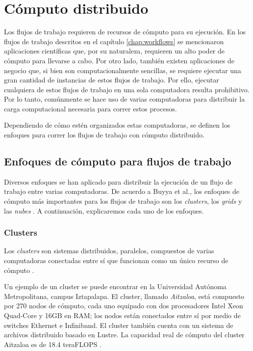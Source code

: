 \chapter{Cómputo distribuido}
Los flujos de trabajo requieren de recursos de cómputo para su ejecución. En los flujos de trabajo descritos en el capítulo \ref{chap:workflows} se mencionaron aplicaciones científicas que, por su naturaleza, requieren un alto poder de cómputo para llevarse a cabo. Por otro lado, también existen aplicaciones de negocio que, si bien son computacionalmente sencillas, se requiere ejecutar una gran cantidad de instancias de estos flujos de trabajo. Por ello, ejecutar cualquiera de estos flujos de trabajo en una sola computadora resulta prohibitivo. Por lo tanto, comúnmente se hace uso de varias computadoras para distribuir la carga computacional necesaria para correr estos procesos.

Dependiendo de cómo estén organizados estas computadoras, se definen los enfoques para correr los flujos de trabajo con cómputo distribuido.

\section{Enfoques de cómputo para flujos de trabajo}
Diversos enfoques se han aplicado para distribuir la ejecución de un flujo de trabajo entre varias computadoras.  De acuerdo a Buyya et al., los enfoques de cómputo más importantes para los flujos de trabajo son los \emph{clusters}, los \emph{grids} y las \emph{nubes} \cite{buyya2009cloud}. A continuación, explicaremos cada uno de los enfoques.

\subsection{Clusters}
Los \emph{clusters} son sistemas distribuidos, paralelos, compuestos de varias computadoras conectadas entre sí que funcionan como un único recurso de cómputo \cite{buyya2009cloud}. 

Un ejemplo de un cluster se puede encontrar en la Universidad Autónoma Metropolitana, campus Iztapalapa. El cluster, llamado \emph{Aitzaloa}, está compuesto por 270 nodos de cómputo, cada uno equipado con dos procesadores Intel Xeon Quad-Core y 16GB en RAM; los nodos están conectados entre sí por medio de switches Ethernet e Infiniband. El cluster también cuenta con un sistema de archivos distribuido basado en Lustre. La capacidad real de cómputo del cluster Aitzaloa es de 18.4 teraFLOPS \cite{uamz2013tizaloa}.

